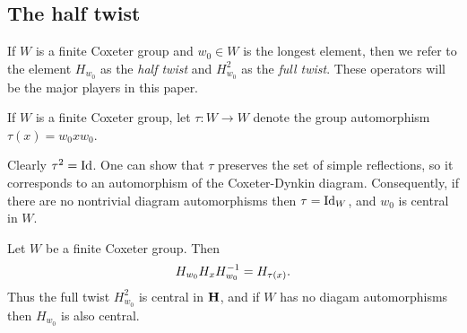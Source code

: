 \subsection{The half twist}
\label{subsec:Hw0}

If $W$ is a finite Coxeter group and $w_0\in W$ is the longest element, then we refer to the element $H_{w_0}$ as the \emph{half twist} and $H_{w_0}^2$ as the \emph{full twist}.  These operators will be the major players in this paper.

\begin{definition}
If $W$ is a finite Coxeter group, let $\tau:W\rightarrow W$ denote the group automorphism $\tau(x)=w_0xw_0$.
\end{definition}

Clearly $\tau^2 = \operatorname{Id}$. One can show that $\tau$ preserves the set of simple reflections, so it corresponds to an automorphism of the Coxeter-Dynkin diagram.  Consequently, if there are no nontrivial diagram automorphisms then $\tau=\operatorname{Id}_W$, and $w_0$ is central in $W$. 



\begin{lemma}\label{lem:ftIsCentral_decat}
Let $W$ be a finite Coxeter group. Then 
\begin{equation} H_{w_0} H_x H_{w_0}^{-1} = H_{\tau(x)}.\end{equation}
Thus the full twist $H_{w_0}^2$ is central in ${\mathbf H}$, and if $W$ has no diagam automorphisms then $H_{w_0}$ is also central.
\end{lemma}

